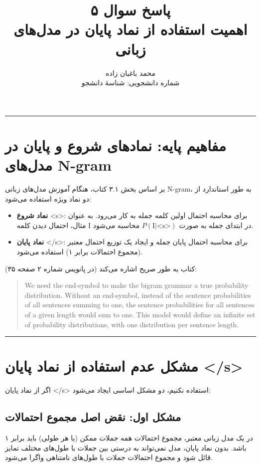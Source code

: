 \documentclass[11pt,a4paper]{article}
\title{\textbf{پاسخ سوال ۵} \\[0.4cm] \footnotesize اهمیت استفاده از نماد پایان \en{</s>} در مدل‌های زبانی \en{N-gram}}
\author{محمد باغبان زاده \\ شماره دانشجویی: شناسهٔ دانشجو}
\date{}
\newcommand{\en}[1]{\textenglish{#1}}
\newcommand{\separator}{\vspace{1em}\noindent\rule{\linewidth}{0.4pt}\vspace{1em}}
\newcommand{\thickseparator}{\vspace{1em}\noindent\rule{\linewidth}{1pt}\vspace{1em}}
\begin{document}
\maketitle
\thickseparator

\section{مفاهیم پایه: نمادهای شروع و پایان در مدل‌های \en{N-gram}}
بر اساس بخش ۳.۱ کتاب، هنگام آموزش مدل‌های زبانی \en{N-gram}، به طور استاندارد از دو نماد ویژه استفاده می‌شود:

\begin{itemize}
\item \textbf{نماد شروع} \en{<s>}: برای محاسبه احتمال اولین کلمه جمله به کار می‌رود. به عنوان مثال، احتمال دیدن کلمه \en{I} در ابتدای جمله به صورت $P(\text{I}|\text{<s>})$ محاسبه می‌شود.

\item \textbf{نماد پایان} \en{</s>}: برای محاسبه احتمال پایان جمله و ایجاد یک توزیع احتمال معتبر (مجموع احتمالات برابر ۱) استفاده می‌شود.
\end{itemize}

کتاب به طور صریح اشاره می‌کند (در پانویس شماره ۲ صفحه ۳۵):

\begin{quote}
\en{We need the end-symbol to make the bigram grammar a true probability distribution. Without an end-symbol, instead of the sentence probabilities of all sentences summing to one, the sentence probabilities for all sentences of a given length would sum to one. This model would define an infinite set of probability distributions, with one distribution per sentence length.}
\end{quote}

\separator
\section{مشکل عدم استفاده از نماد پایان \en{</s>}}
اگر از نماد پایان \en{</s>} استفاده نکنیم، دو مشکل اساسی ایجاد می‌شود:

\subsection*{مشکل اول: نقض اصل مجموع احتمالات}
در یک مدل زبانی معتبر، مجموع احتمالات همه جملات ممکن (با هر طولی) باید برابر ۱ باشد. بدون نماد پایان، مدل نمی‌تواند به درستی بین جملات با طول‌های مختلف تمایز قائل شود و مجموع احتمالات جملات با طول‌های نامتناهی واگرا می‌شود.
\end{document}
